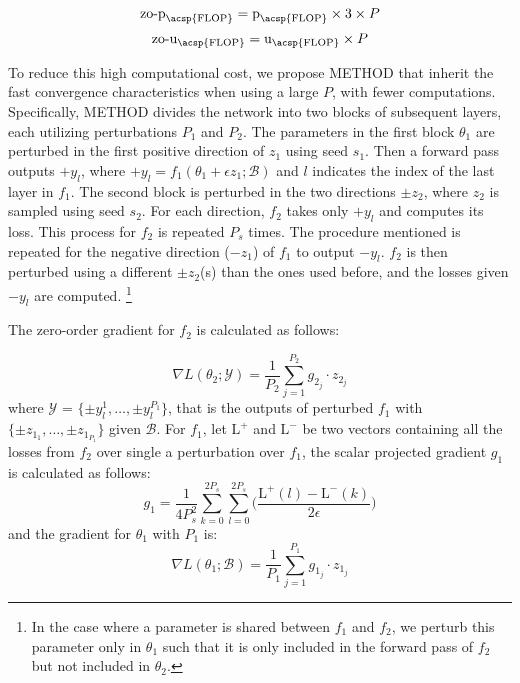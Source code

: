 \begin{equation}
    \text{zo-p}_{\text{\acsp{FLOP}}} = \text{p}_{\text{\acsp{FLOP}}} \times 3 \times P 
\end{equation}
\begin{equation}
    \text{zo-u}_{\text{\acsp{FLOP}}} = \text{u}_{\text{\acsp{FLOP}}} \times P
\end{equation}

To reduce this high computational cost, we propose \ac{METHOD} that inherit the fast convergence characteristics when using a large $P$,  with fewer computations. Specifically, \ac{METHOD} divides the network into two blocks of subsequent layers, each utilizing perturbations $P_{1}$ and $P_{2}$. The parameters in the first block $\theta_{1}$ are perturbed in the first positive direction of $z_{1}$ using seed $s_{1}$. Then a forward pass outputs $+y_{l}$, where $+y_{l} = f_{1}(\theta_{1} + \epsilon z_{1}; \mathcal{B})$ and $l$ indicates the index of the last layer in $f_{1}$. The second block is perturbed in the two directions $\pm z_{2}$, where $z_{2}$ is sampled using seed $s_{2}$. For each direction, $f_{2}$ takes only $+y_{l}$ and computes its loss. This process for $f_{2}$ is repeated $P_{s}$ times. The procedure mentioned is repeated for the negative direction ($-z_{1}$) of $f_{1}$ to output $-y_{l}$. $f_{2}$ is then perturbed using a different $\pm z_{2}$(s) than the ones used before, and the losses given $-y_{l}$ are computed. \footnote{In the case where a parameter is shared between $f_1$ and $f_2$, we perturb this parameter only in $\theta_{1}$ such that it is only included in the forward pass of $f_{2}$ but not included in $\theta_{2}$.} 


The zero-order gradient for $f_{2}$ is calculated as follows:

\begin{equation}
    \nabla L(\theta_{2}; \mathcal{Y}) = \frac{1}{P_{2}} \sum_{j=1}^{P_{2}} g_{2_{j}} \cdot z_{2_{j}}
\end{equation}
where $\mathcal{Y}$ = $\{\pm y_{l}^{1}, \dots, \pm y_{l}^{P_{1}}\}$, that is the outputs of perturbed $f_{1}$ with $\{\pm z_{1_{1}}, \dots, \pm z_{1_{P_{1}}}\}$ given $\mathcal{B}$.  For $f_{1}$, let $\text{L}^{+}$ and  $\text{L}^{-}$ be two vectors containing all the losses from $f_{2}$ over single a perturbation over $f_{1}$, the scalar projected gradient $g_{1}$ is calculated as follows:
\begin{equation}
g_{1} = \frac{1}{4 P_{s}^{2}} \sum_{k=0}^{2P_{s}} \sum_{l=0}^{2P_{s}} \big( \frac{\text{L}^{+} (l) - \text{L}^{-} (k)} {2\epsilon} \big)
\label{eq:avg_grad}
\end{equation}
and the gradient for $\theta_{1}$ with $P_{1}$ is: 
\begin{equation}
    \nabla L(\theta_{1}; \mathcal{B}) = \frac{1}{P_{1}} \sum_{j=1}^{P_{1}} g_{1_{j}} \cdot z_{1_{j}}
\end{equation}

